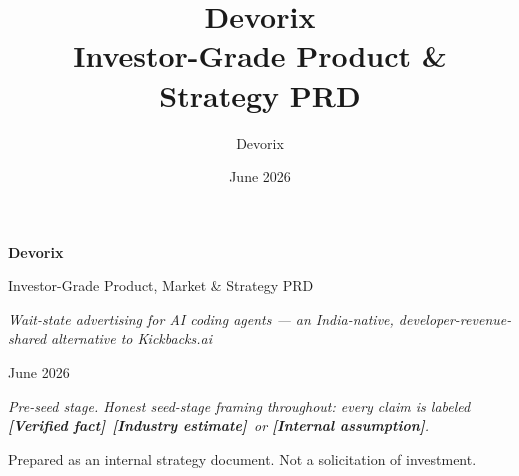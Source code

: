 \documentclass[11pt,a4paper,oneside]{report}
\title{\Huge\textbf{Devorix}\\[0.3em]\Large Investor-Grade Product \& Strategy PRD}
\author{Devorix}
\date{June 2026}
\newcommand{\verifiedfact}{\textcolor{green!35!black}{\textbf{[Verified fact]}}}
\newcommand{\industryestimate}{\textcolor{orange!70!black}{\textbf{[Industry estimate]}}}
\newcommand{\internalassumption}{\textcolor{red!50!black}{\textbf{[Internal assumption]}}}
\begin{document}
\begin{titlepage}
  \centering
  \vspace*{2cm}
  {\Huge\bfseries Devorix\par}
  \vspace{0.5cm}
  {\Large Investor-Grade Product, Market \& Strategy PRD\par}
  \vspace{1.5cm}
  {\large\itshape Wait-state advertising for AI coding agents --- an India-native, developer-revenue-shared alternative to Kickbacks.ai\par}
  \vspace{2cm}
  {\large June 2026\par}
  \vspace{1cm}
  {\normalsize\itshape Pre-seed stage. Honest seed-stage framing throughout: every claim is labeled\\
  \verifiedfact\ \industryestimate\ or \internalassumption.\par}
  \vfill
  {\small Prepared as an internal strategy document. Not a solicitation of investment.\par}
\end{titlepage}

\tableofcontents
\listoffigures
\listoftables
\clearpage














\clearpage


\end{document}
